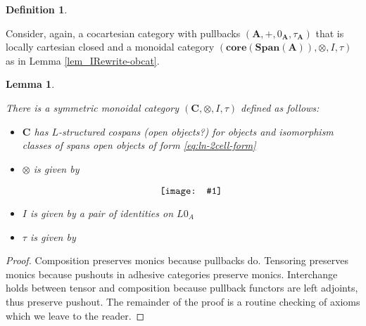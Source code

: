 \documentclass{amsart}
\newcommand{\A}{\cat{A}}
\newcommand{\C}{\cat{C}}
\newcommand{\core}{\mathbf{core}}
\newcommand{\cat}[1]{\mathbf{#1}}
\newcommand{\diagram}[1]{\raisebox{-0.5\height}{\texttt{[image: \#1]}}}
\newcommand{\Span}{\mathbf{Span}}
\newcommand{\edit}[1]{\textcolor{editcolour}{(#1)}}
\newtheorem{lemma}[theorem]{Lemma}
\theoremstyle{remark}
\theoremstyle{definition}
\newtheorem{definition}[theorem]{Definition}
\begin{document}
\begin{definition}
  \label{def:mon-rewrite-obcat}
 
  Consider, again, a cocartesian category with pullbacks
  $ (\A , + , 0_{\A} , \tau_\A ) $
  that is locally cartesian closed and a monoidal category
  $ ( \core ( \Span ( \A )) , \otimes , I , \tau )$
  as in Lemma \ref{lem_IRewrite-obcat}.
  
\end{definition}

\begin{lemma}
  \label{thm:mon-rewrite-arrcat}
  
  There is a symmetric monoidal category
  $ ( \C , \otimes , I , \tau ) $ defined as follows:
  \begin{itemize}
   \item $ \C $ has $ L $-structured cospans \edit{open objects?}
          for objects and isomorphism classes of spans open objects of
          form \eqref{eq:ln-2cell-form}
   \item $ \otimes $ is given by
         \[
            \diagram{diag_lr_dbl-rewrite-tensor}
         \]
   \item $ I $ is given by a pair of identities on $ L0_A $
   \item $ \tau $ is given by
        \begin{center}
          \diagram{diag_lr_dbl-rewrite-braiding}
        \end{center}
   \end{itemize}
\end{lemma}

\begin{proof}
  
  Composition preserves monics because pullbacks do. Tensoring
  preserves monics because pushouts in adhesive categories preserve
  monics. Interchange holds between tensor and composition because
  pullback functors are left adjoints, thus preserve pushout. The
  remainder of the proof is a routine checking of axioms which we
  leave to the reader.
 
\end{proof}
\end{document}
